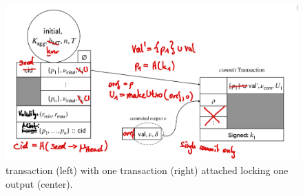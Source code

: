 \begin{figure}[h]

  \centering


  \includegraphics[width=\textwidth/2]{figures/SM_commit_tx.png}

  \caption{
    \mtxInit{} transaction (left) with one \mtxCom{} transaction
    (right) attached locking one output (center).}\label{fig:SM_commit_tx}

\end{figure}


